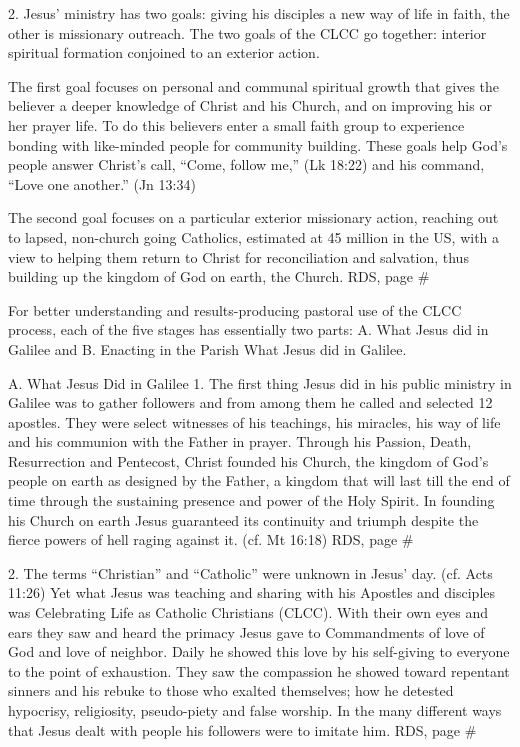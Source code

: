 \documentclass[oneside]{book}
\begin{document}
2. Jesus' ministry has two goals: giving his disciples a new way of life in
faith, the other is missionary outreach. The two goals of the CLCC go together:
interior spiritual formation conjoined to an exterior action.

The first goal focuses on personal and communal spiritual growth that gives the
believer a deeper knowledge of Christ and his Church, and on improving his or
her prayer life. To do this believers enter a small faith group to experience
bonding with like-minded people for community building. These goals help God's
people answer Christ's call, ``Come, follow me,'' (Lk 18:22) and his command,
``Love one another.'' (Jn 13:34)

The second goal focuses on a particular exterior missionary action, reaching out
to lapsed, non-church going Catholics, estimated at 45 million in the US, with a
view to helping them return to Christ for reconciliation and salvation, thus
building up the kingdom of God on earth, the Church.
RDS, page \#

For better understanding and results-producing pastoral use of the CLCC process,
each of the five stages has essentially two parts: A. What Jesus did in Galilee
and B. Enacting in the Parish What Jesus did in Galilee.

A. What Jesus Did in Galilee
1. The first thing Jesus did in his public ministry in Galilee was to gather
followers and from among them he called and selected 12 apostles. They were
select witnesses of his teachings, his miracles, his way of life and his
communion with the Father in prayer. Through his Passion, Death, Resurrection
and Pentecost, Christ founded his Church, the kingdom of God's people on earth
as designed by the Father, a kingdom that will last till the end of time through
the sustaining presence and power of the Holy Spirit. In founding his Church on
earth Jesus guaranteed its continuity and triumph despite the fierce powers of
hell raging against it. (cf. Mt 16:18)
RDS, page \#

2. The terms ``Christian'' and ``Catholic'' were unknown in Jesus'
day. (cf. Acts 11:26) Yet what Jesus was teaching and sharing with his Apostles
and disciples was Celebrating Life as Catholic Christians (CLCC). With their own
eyes and ears they saw and heard the primacy Jesus gave to Commandments of love
of God and love of neighbor. Daily he showed this love by his self-giving to
everyone to the point of exhaustion. They saw the compassion he showed toward
repentant sinners and his rebuke to those who exalted themselves; how he
detested hypocrisy, religiosity, pseudo-piety and false worship. In the many
different ways that Jesus dealt with people his followers were to imitate him.
RDS, page \#
\end{document}
